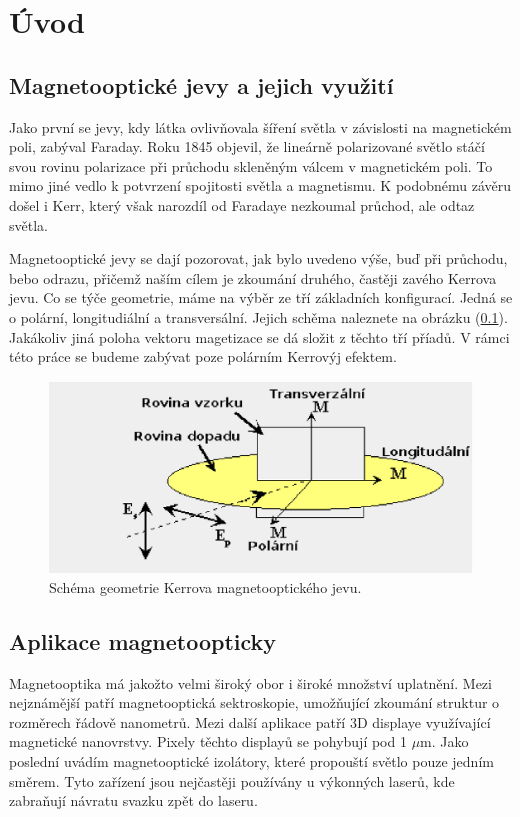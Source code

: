 \chapter*{Úvod}

\section{Magnetooptické jevy a jejich využití}
Jako první se jevy, kdy látka ovlivňovala šíření světla v závislosti na magnetickém poli, zabýval Faraday. Roku 1845 objevil, že lineárně polarizované světlo stáčí svou rovinu polarizace při průchodu skleněným válcem v magnetickém poli. To mimo jiné vedlo k potvrzení spojitosti světla a magnetismu. K podobnému závěru došel i Kerr, který však narozdíl od Faradaye nezkoumal průchod, ale odtaz světla.

Magnetooptické jevy se dají pozorovat, jak bylo uvedeno výše, buď při průchodu, bebo odrazu, přičemž naším cílem je zkoumání druhého, častěji zavého Kerrova jevu. Co se týče geometrie, máme na výběr ze tří základních konfigurací. Jedná se o polární, longitudiální a transversální. Jejich schěma naleznete na obrázku (\ref{schema geo}). Jakákoliv jiná poloha vektoru magetizace se dá složit z těchto tří příadů. V rámci této práce se budeme zabývat poze polárním Kerrovýj efektem.

\begin{figure}
\begin{center}
    \includegraphics[width=5in]{img/polar.eps}
\end{center}
    \caption{Schéma geometrie Kerrova magnetooptického jevu.}
    \label{schema geo}
\end{figure}

\section{Aplikace magnetoopticky}
Magnetooptika má jakožto velmi široký obor i široké množství uplatnění. Mezi nejznámější patří magnetooptická sektroskopie, umožňující zkoumání struktur o rozměrech řádově nanometrů. Mezi další aplikace patří 3D displaye využívající magnetické nanovrstvy. Pixely těchto displayů se pohybují pod 1 $\mu$m. Jako poslední uvádím magnetooptické izolátory, které propouští světlo pouze jedním směrem. Tyto zařízení jsou nejčastěji používány u výkonných laserů, kde zabraňují návratu svazku zpět do laseru.
